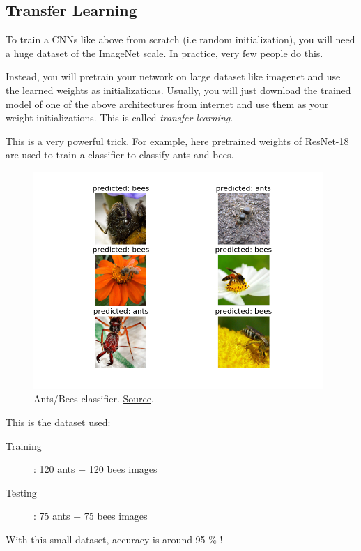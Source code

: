 \documentclass[a4paper]{tufte-handout}
\begin{document}
\subsection{Transfer Learning}\label{transfer-learning}

To train a CNNs like above from scratch (i.e random initialization), you
will need a huge dataset of the ImageNet scale. In practice, very few
people do this.

Instead, you will pretrain your network on large dataset like imagenet
and use the learned weights as initializations. Usually, you will just
download the trained model of one of the above architectures from
internet and use them as your weight initializations. This is called
\emph{transfer learning}.

This is a very powerful trick. For example,
\href{http://pytorch.org/tutorials/beginner/transfer_learning_tutorial.html}{here}
pretrained weights of ResNet-18 are used to train a classifier to
classify ants and bees.

\begin{figure}
\includegraphics[width=110mm]{transfer_learning.png}
\caption{Ants/Bees classifier.
\href{http://pytorch.org/tutorials/beginner/transfer_learning_tutorial.html}{Source}.
}  
\end{figure}

This is the dataset used:
\begin{description}
\item[Training]: 120 ants + 120 bees images
\item[Testing]: 75 ants + 75 bees images
\end{description}

With this small dataset, accuracy is around 95 \% !
\end{document}

